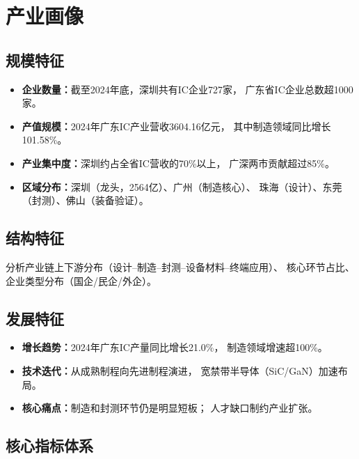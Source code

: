 \documentclass[12pt,a4paper]{ctexart}
\begin{document}
\section{产业画像}
\label{sec:industry}

\subsection{规模特征}
\label{sec:scale}

\begin{itemize}
    \item \textbf{企业数量：}截至2024年底，深圳共有IC企业727家，
          广东省IC企业总数超1000家。
    \item \textbf{产值规模：}2024年广东IC产业营收3604.16亿元，
          其中制造领域同比增长101.58\%。
    \item \textbf{产业集中度：}深圳约占全省IC营收的70\%以上，
          广深两市贡献超过85\%。
    \item \textbf{区域分布：}深圳（龙头，2564亿）、广州（制造核心）、
          珠海（设计）、东莞（封测）、佛山（装备验证）。
\end{itemize}

\subsection{结构特征}
\label{sec:structure}

分析产业链上下游分布（设计--制造--封测--设备材料--终端应用）、
核心环节占比、企业类型分布（国企/民企/外企）。

\subsection{发展特征}
\label{sec:development}

\begin{itemize}
    \item \textbf{增长趋势：}2024年广东IC产量同比增长21.0\%，
          制造领域增速超100\%。
    \item \textbf{技术迭代：}从成熟制程向先进制程演进，
          宽禁带半导体（SiC/GaN）加速布局。
    \item \textbf{核心痛点：}制造和封测环节仍是明显短板；
          人才缺口制约产业扩张。
\end{itemize}

\subsection{核心指标体系}
\label{sec:indicators}
\end{document}
